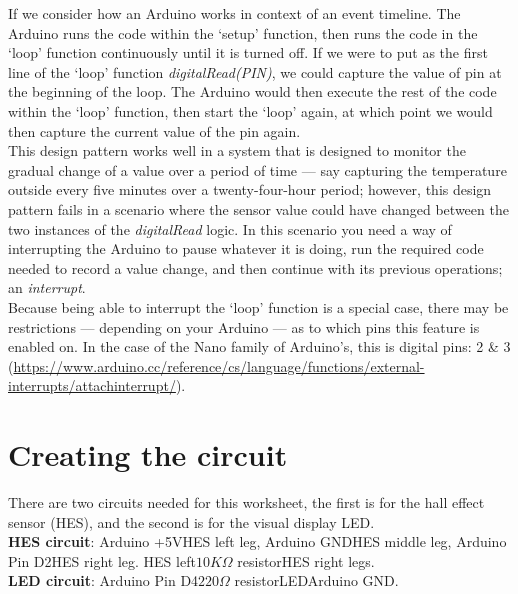 \documentclass[11pt,a4paper]{article}
\begin{document}
\noindent
If we consider how an Arduino works in context of an event timeline. The Arduino runs the code within the `setup' function, then runs the code in the `loop' function continuously until it is turned off. If we were to put as the first line of the `loop' function \textit{digitalRead(PIN)}, we could capture the value of pin at the beginning of the loop. The Arduino would then execute the rest of the code within the `loop' function, then start the `loop' again, at which point we would then capture the current value of the pin again.\\

\noindent
This design pattern works well in a system that is designed to monitor the gradual change of a value over a period of time --- say capturing the temperature outside every five minutes over a twenty-four-hour period; however, this design pattern fails in a scenario where the sensor value could have changed between the two instances of the \textit{digitalRead} logic. In this scenario you need a way of interrupting the Arduino to pause whatever it is doing, run the required code needed to record a value change, and then continue with its previous operations; an \textit{interrupt}.\\

\noindent
Because being able to interrupt the `loop' function is a special case, there may be restrictions --- depending on your Arduino --- as to which pins this feature is enabled on. In the case of the Nano family of Arduino's, this is digital pins: 2 \& 3 (\url{https://www.arduino.cc/reference/cs/language/functions/external-interrupts/attachinterrupt/}).\\

\section{Creating the circuit}
\label{sec:circuit}
There are two circuits needed for this worksheet, the first is for the hall effect sensor (HES), and the second is for the visual display LED.\\
\noindent
\textbf{HES circuit}: Arduino +5V\textrightarrow\hspace{0.1em}HES left leg, Arduino GND\textrightarrow\hspace{0.1em}HES middle leg, Arduino Pin D2\textrightarrow\hspace{0.1em}HES right leg. HES left\textrightarrow \hspace{0.1em}$10K\Omega$ resistor\textrightarrow\hspace{0.1em}HES right legs.\\
\noindent
\textbf{LED circuit}: Arduino Pin D4\textrightarrow $220\Omega$ resistor\textrightarrow LED\textrightarrow Arduino GND.\\
\end{document}
